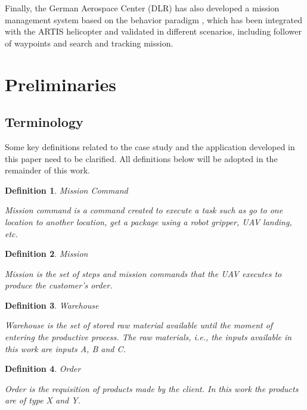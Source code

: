 \documentclass[conference,harvard,brazil,english]{sbatex}
\newtheorem{myDefinition}{Definition}
\begin{document}
Finally, the German Aerospace Center (DLR) has also developed a mission management system based on the behavior paradigm \cite{adolf2010onboard}, which has been integrated with the ARTIS helicopter and validated in different scenarios, including follower of waypoints and search and tracking mission.

\section{Preliminaries}
\label{sec:background}

\subsection{Terminology}
\label{sec:terms}

Some key definitions related to the case study and the application developed in this paper need to be clarified. All definitions below will be adopted in the remainder of this work.

\begin{myDefinition}{Mission Command}

Mission command is a command created to execute a task such as go to one location to another location, get a package using a robot gripper, UAV landing, etc.


\label{def:missioncommand}
\end{myDefinition}

\begin{myDefinition}{Mission}

Mission is the set of steps and mission commands that the UAV executes to produce the customer's order.
\label{def:mission}
\end{myDefinition}

\begin{myDefinition}{Warehouse}

Warehouse is the set of stored raw material available until the moment of entering the productive process. The raw materials, \textit{i.e.}, the inputs available in this work are inputs A, B and C.
\label{almoxarifado}
\end{myDefinition}

\begin{myDefinition}{Order}

Order is the requisition of products made by the client. In this work the products are of type X and Y.
\label{pedido}
\end{myDefinition}
\end{document}
